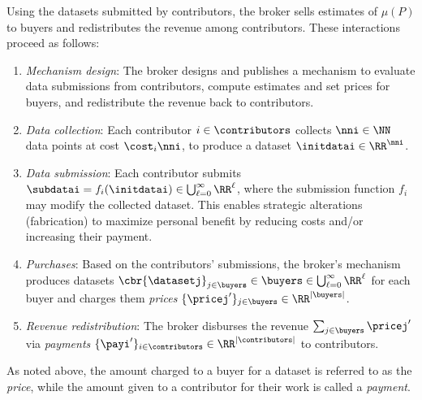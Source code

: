 Using the datasets submitted by contributors, the broker sells estimates of $\mu(P)$ to buyers and redistributes the revenue among contributors. These interactions proceed as follows:
\vspace{-0.15in}
\begin{enumerate} [leftmargin=0.16in]
    \item \emph{Mechanism design}:
    \label{itm:mechanismdesign}
    The broker designs and publishes a mechanism  to evaluate data submissions from
contributors, compute estimates and set prices for buyers, and redistribute the revenue back to contributors.
\vspace{-0.10in}
    \item \emph{Data collection}:
    \label{itm:datacollection}
Each contributor $i \in \contributors$ collects $\nni \in \NN$ data points at cost $\cost_i \nni$, to produce a dataset $\initdatai \in \RR^{\nni}$.
\vspace{-0.1in}
    \item \emph{Data submission}:
    \label{itm:datasubmission}
    Each contributor submits $\subdatai = f_i(\initdatai) \in \bigcup_{\ell=0}^\infty \RR^\ell$, where the submission function $f_i$ may modify the collected dataset. This enables strategic
alterations (\eg fabrication) to maximize personal benefit by reducing costs and/or
increasing their payment. \hspace{-0.5in}
\vspace{-0.26in}

    \item \emph{Purchases}:
    \label{itm:pricing}
     Based on the contributors' submissions, the broker's mechanism produces datasets $\cbr{\datasetj}_{j \in \buyers} \in \buyers\in \bigcup_{\ell=0}^\infty \RR^\ell $ for each buyer and charges them \emph{prices} $\{\pricej'\}_{j \in \buyers}\in\RR^{|\buyers|}$.

\vspace{-0.1in}
    \item \emph{Revenue redistribution}: \hspace{-0.05in}
    \label{itm:revenueredistribution}
    The broker disburses the revenue $\sum_{j \in \buyers} \pricej'$ via \emph{payments} $\{\payi'\}_{i \in \contributors} \in \RR^{|\contributors|}$  to contributors.
\end{enumerate}


As noted above, the amount charged to a buyer for a dataset is referred to as the \emph{price}, while the amount given to a contributor for their work is called a \emph{payment}.  



